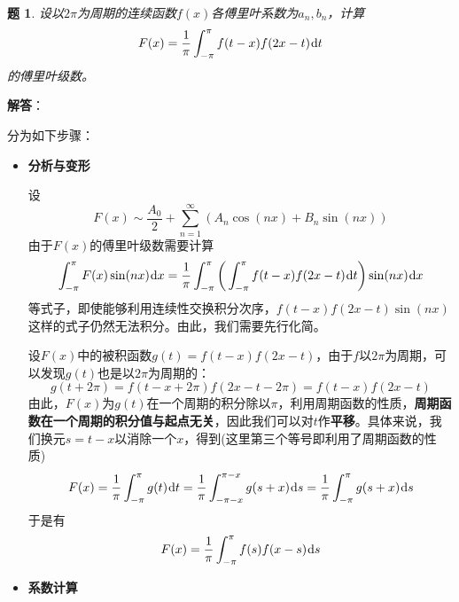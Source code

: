 \documentclass[a4paper,UTF8,fontset=windows,AutoFakeBold]{ctexart}
\newcommand*{\dr}{\hspace{0.07em}\mathrm{d}}
\newcommand*{\suminf}[1][n=1]{\sum_{#1}^\infty}
\theoremstyle{ex}
\newtheorem{exercise}{题}
\newcommand{\sol}[1]{{\vspace{5pt}\kaishu\noindent\textbf{解答}：\vspace{-3pt}
\begin{compactitem}
    \item[] #1
\end{compactitem}
}}
\begin{document}
\begin{framed}
\begin{exercise}
    设以$2\pi$为周期的连续函数$f(x)$各傅里叶系数为$a_n,b_n$，计算
    $$F(x)=\frac{1}{\pi}\int_{-\pi}^\pi f(t-x)f(2x-t)\dr t$$
    的傅里叶级数。
\end{exercise}
\sol{
    分为如下步骤：
    \begin{itemize}
        \item \textbf{分析与变形}
        
        设
        $$F(x)\sim\frac{A_0}{2}+\suminf(A_n\cos(nx)+B_n\sin(nx))$$
        由于$F(x)$的傅里叶级数需要计算
        $$\int_{-\pi}^\pi F(x)\sin(nx)\dr x=\frac{1}{\pi}\int_{-\pi}^\pi\bigg(\int_{-\pi}^\pi f(t-x)f(2x-t)\dr t\bigg)\sin(nx)\dr x$$
        等式子，即使能够利用连续性交换积分次序，$f(t-x)f(2x-t)\sin(nx)$这样的式子仍然无法积分。由此，我们需要先行化简。

        设$F(x)$中的被积函数$g(t)=f(t-x)f(2x-t)$，由于$f$以$2\pi$为周期，可以发现$g(t)$也是以$2\pi$为周期的：
        $$g(t+2\pi)=f(t-x+2\pi)f(2x-t-2\pi)=f(t-x)f(2x-t)$$
        由此，$F(x)$为$g(t)$在一个周期的积分除以$\pi$，利用周期函数的性质，\textbf{周期函数在一个周期的积分值与起点无关}，因此我们可以对$t$作\textbf{平移}。具体来说，我们换元$s=t-x$以消除一个$x$，得到(这里第三个等号即利用了周期函数的性质)
        $$F(x)=\frac{1}{\pi}\int_{-\pi}^\pi g(t)\dr t=\frac{1}{\pi}\int_{-\pi-x}^{\pi-x}g(s+x)\dr s=\frac{1}{\pi}\int_{-\pi}^\pi g(s+x)\dr s$$
        于是有
        $$F(x)=\frac{1}{\pi}\int_{-\pi}^\pi f(s)f(x-s)\dr s$$

        \item \textbf{系数计算}
        

\end{itemize}}
\end{framed}
\end{document}
